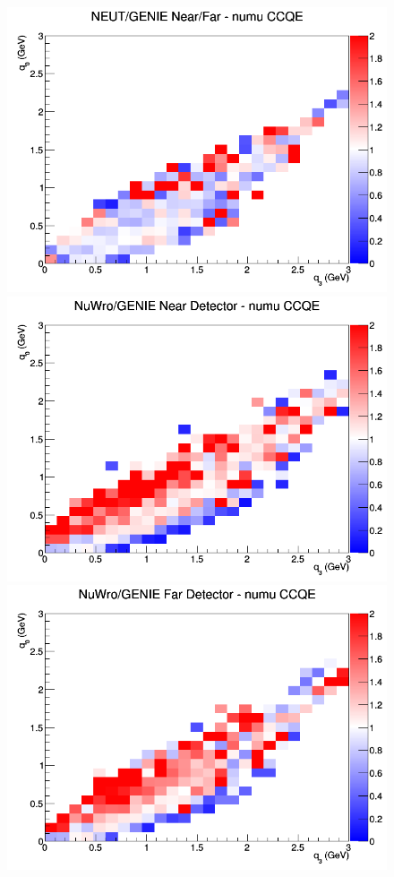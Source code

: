 \documentclass[12pt]{article}
\begin{document}
\begin{figure}[h]
\endminipage
{}
\includegraphics[width=\linewidth]{eff_q0_q3/GAr/ratios/CCQE_NEUT_GENIE_numu_NF_q3_q0.png}
\endminipage
\newline
{}
\includegraphics[width=\linewidth]{eff_q0_q3/GAr/ratios/CCQE_NuWro_GENIE_numu_near_q3_q0.png}
\endminipage
{}
\includegraphics[width=\linewidth]{eff_q0_q3/GAr/ratios/CCQE_NuWro_GENIE_numu_far_q3_q0.png}

\end{figure}
\end{document}
